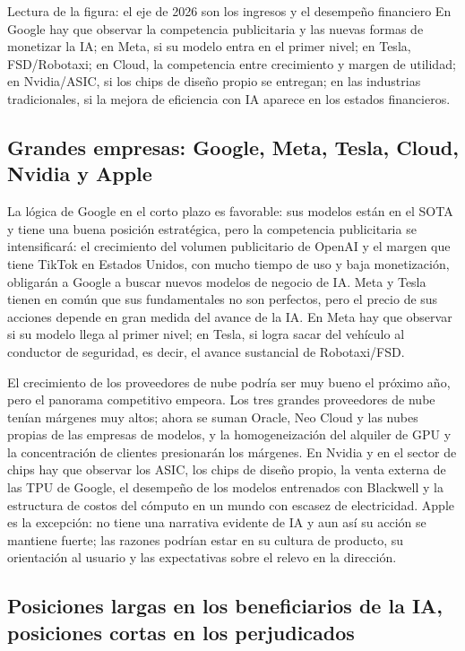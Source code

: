 \documentclass[a4paper]{article}
\begin{document}
\begin{knowledgebox}{Lectura de la figura: el eje de 2026 son los ingresos y el desempeño financiero}
En Google hay que observar la competencia publicitaria y las nuevas formas de monetizar la IA; en Meta, si su modelo entra en el primer nivel; en Tesla, FSD/Robotaxi; en Cloud, la competencia entre crecimiento y margen de utilidad; en Nvidia/ASIC, si los chips de diseño propio se entregan; en las industrias tradicionales, si la mejora de eficiencia con IA aparece en los estados financieros.
\end{knowledgebox}

\subsection{Grandes empresas: Google, Meta, Tesla, Cloud, Nvidia y Apple}

La lógica de Google en el corto plazo es favorable: sus modelos están en el SOTA y tiene una buena posición estratégica, pero la competencia publicitaria se intensificará: el crecimiento del volumen publicitario de OpenAI y el margen que tiene TikTok en Estados Unidos, con mucho tiempo de uso y baja monetización, obligarán a Google a buscar nuevos modelos de negocio de IA. Meta y Tesla tienen en común que sus fundamentales no son perfectos, pero el precio de sus acciones depende en gran medida del avance de la IA. En Meta hay que observar si su modelo llega al primer nivel; en Tesla, si logra sacar del vehículo al conductor de seguridad, es decir, el avance sustancial de Robotaxi/FSD.

El crecimiento de los proveedores de nube podría ser muy bueno el próximo año, pero el panorama competitivo empeora. Los tres grandes proveedores de nube tenían márgenes muy altos; ahora se suman Oracle, Neo Cloud y las nubes propias de las empresas de modelos, y la homogeneización del alquiler de GPU y la concentración de clientes presionarán los márgenes. En Nvidia y en el sector de chips hay que observar los ASIC, los chips de diseño propio, la venta externa de las TPU de Google, el desempeño de los modelos entrenados con Blackwell y la estructura de costos del cómputo en un mundo con escasez de electricidad. Apple es la excepción: no tiene una narrativa evidente de IA y aun así su acción se mantiene fuerte; las razones podrían estar en su cultura de producto, su orientación al usuario y las expectativas sobre el relevo en la dirección.

\subsection{Posiciones largas en los beneficiarios de la IA, posiciones cortas en los perjudicados}
\end{document}
